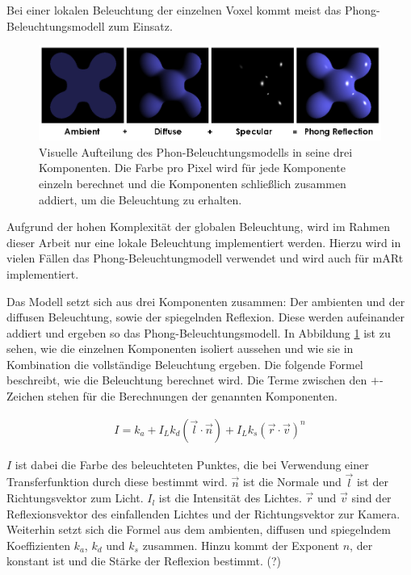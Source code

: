 Bei einer lokalen Beleuchtung der einzelnen Voxel kommt meist das Phong-Beleuchtungsmodell zum Einsatz. 

\begin{figure}
	\centering
	\includegraphics[width=0.7\linewidth]{images/Phong_components_version_4.png}
	\caption{Visuelle Aufteilung des Phon-Beleuchtungsmodells in seine drei Komponenten. Die Farbe pro Pixel wird für jede Komponente einzeln berechnet und die Komponenten schließlich zusammen addiert, um die Beleuchtung zu erhalten. }
	\label{img:phong}
\end{figure}

Aufgrund der hohen Komplexität der globalen Beleuchtung, wird im Rahmen dieser Arbeit nur eine lokale Beleuchtung implementiert werden. 
Hierzu wird in vielen Fällen das Phong-Beleuchtungmodell verwendet und wird auch für mARt implementiert.

Das Modell setzt sich aus drei Komponenten zusammen: Der ambienten und der diffusen Beleuchtung, sowie der spiegelnden Reflexion. Diese werden aufeinander addiert und ergeben so das Phong-Beleuchtungsmodell.  In Abbildung \ref{img:phong} ist zu sehen, wie die einzelnen Komponenten isoliert aussehen und wie sie in Kombination die vollständige Beleuchtung ergeben.
Die folgende Formel beschreibt, wie die Beleuchtung berechnet wird. Die Terme zwischen den $+$-Zeichen stehen für die Berechnungen der genannten Komponenten.

\begin{align}
I = k_{a}+I_{L}k_{d}(\vec{l}\cdot\vec{n})+I_{L}k_{s}(\vec{r}\cdot\vec{v})^n
\end{align}


$I$ ist dabei die Farbe des beleuchteten Punktes, die bei Verwendung einer Transferfunktion durch diese bestimmt wird. $\vec{n}$ ist die Normale und $\vec{l}$ ist der Richtungsvektor zum Licht. $I_{l}$ ist die Intensität des Lichtes. $\vec{r}$ und $\vec{v}$ sind der Reflexionsvektor des einfallenden Lichtes und der Richtungsvektor zur Kamera. Weiterhin setzt sich die Formel aus dem ambienten, diffusen und spiegelndem Koeffizienten $k_{a}$, $k_{d}$ und $k_{s}$ zusammen. Hinzu kommt der Exponent $n$, der konstant ist und die Stärke der Reflexion bestimmt. (?)

